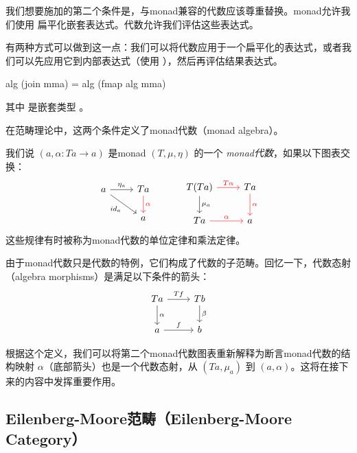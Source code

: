 \documentclass[DaoFP]{subfiles}
\begin{document}
    我们想要施加的第二个条件是，与monad兼容的代数应该尊重替换。monad允许我们使用  扁平化嵌套表达式。代数允许我们评估这些表达式。

    有两种方式可以做到这一点：我们可以将代数应用于一个扁平化的表达式，或者我们可以先应用它到内部表达式（使用 ），然后再评估结果表达式。
    \begin{haskell}
        alg (join mma) = alg (fmap alg mma)
    \end{haskell}
    其中  是嵌套类型 。

    在范畴理论中，这两个条件定义了monad代数（monad algebra）。

    我们说 $(a, \alpha \colon T a \to a)$ 是monad $(T, \mu, \eta)$ 的一个 \emph{monad代数}，如果以下图表交换：
    \[
        \begin{tikzcd}
            a
            \arrow[r, "\eta_a"]
            \arrow[dr, "id_a"']
            & T a
            \arrow[d, red, "\alpha"]
            \\
            & a
        \end{tikzcd}
        \hspace{30pt}
        \begin{tikzcd}
            T(T a)
            \arrow[r, red, "T \alpha "]
            \arrow[d, "\mu_a"]
            &T a
            \arrow[d, red, "\alpha"]
            \\
            T a
            \arrow[r, red, "\alpha"]
            & a
        \end{tikzcd}
    \]
    这些规律有时被称为monad代数的单位定律和乘法定律。

    由于monad代数只是代数的特例，它们构成了代数的子范畴。回忆一下，代数态射（algebra morphisms）是满足以下条件的箭头：
    \[
        \begin{tikzcd}
            T a
            \arrow[r, "T f"]
            \arrow[d, "\alpha"]
            & T b
            \arrow[d, "\beta"]
            \\
            a
            \arrow[r, "f"]
            & b
        \end{tikzcd}
    \]

    根据这个定义，我们可以将第二个monad代数图表重新解释为断言monad代数的结构映射 $\alpha$（底部箭头）也是一个代数态射，从 $(T a, \mu_a)$ 到 $(a, \alpha)$。这将在接下来的内容中发挥重要作用。

    \subsection{Eilenberg-Moore范畴（Eilenberg-Moore Category）}
\end{document}
